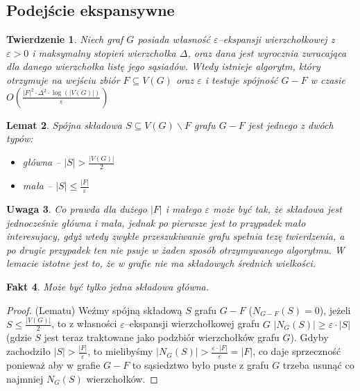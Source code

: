 \documentclass{pracamgr}
\newtheorem{theorem}{Twierdzenie}
\newtheorem{lemma}[theorem]{Lemat}
\newtheorem{remark}[theorem]{Uwaga}
\newtheorem{fact}[theorem]{Fakt}
\begin{document}
   \subsection{Podejście ekspansywne}\label{podejscie ekspansywne}
    \begin{theorem}\label{Spójność ekspansywna}
     Niech graf $G$ posiada własność $\varepsilon$--ekspansji wierzchołkowej z $\varepsilon>0$ i maksymalny stopień wierzchołka $\Delta$,
     oraz dana jest wyrocznia zwracająca dla danego wierzchołka listę jego sąsiadów.
     Wtedy istnieje algorytm, który otrzymuje na wejściu zbiór $F\subseteq V(G)$ oraz $\varepsilon$
     i testuje spójność $G-F$ w czasie $O\left(\frac{|F|^2\cdot\Delta^2\cdot\log(|V(G)|)}{\varepsilon}\right)$
    \end{theorem}
    \begin{lemma}\label{klasyfikacja skladowych}
     Spójna składowa $S\subseteq V(G)\backslash F$ grafu $G-F$ jest jednego z dwóch typów:
     \begin{itemize}
      \item główna -- $|S|>\frac{|V(G)|}{2}$
      \item mała -- $|S|\le\frac{|F|}{\varepsilon}$
     \end{itemize}
    \end{lemma}
    \begin{remark}\label{klasyfikacja skladowych 2}
     Co prawda dla dużego $|F|$ i małego $\varepsilon$ może być tak, że składowa jest jednocześnie główna i mała, jednak po pierwsze jest to przypadek mało
     interesujacy, gdyż wtedy zwykłe przeszukiwanie grafu spełnia tezę twierdzenia, a po drugie przypadek ten nie psuje w żaden sposób otrzymywanego algorytmu.
     W lemacie istotne jest to, że w grafie nie ma składowych średnich wielkości.
    \end{remark}
    \begin{fact}\label{jedna glowna skladowa}
     Może być tylko jedna składowa główna.
    \end{fact}
    \begin{proof}
     (Lematu)\newline
     Weźmy spójną składową $S$ grafu $G-F$ ($N_{G-F}(S)=0$), jeżeli $S\le\frac{|V(G)|}{2}$, to z własności $\varepsilon$--ekspansji wierzchołkowej grafu $G$
     $|N_G(S)|\ge\varepsilon\cdot|S|$ (gdzie $S$ jest teraz traktowane jako podzbiór wierzchołków grafu $G$). Gdyby zachodziło $|S|>\frac{|F|}{\varepsilon}$,
     to mielibyśmy $|N_G(S)|>\frac{\varepsilon\cdot|F|}{\varepsilon}=|F|$, co daje sprzeczność ponieważ aby w grafie $G-F$ to sąsiedztwo było puste z grafu
     $G$ trzeba usunąć co najmniej $N_G(S)$ wierzchołków.
    \end{proof}
\end{document}
